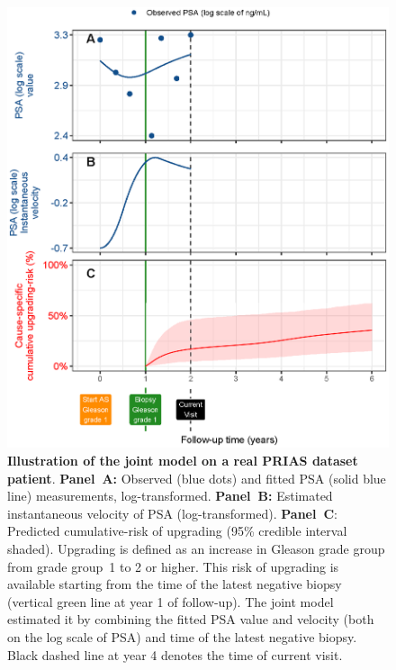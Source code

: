 \begin{figure}
\centerline{\includegraphics[width=\columnwidth]{images/jmExplanationPlot_113.eps}}
\caption{\textbf{Illustration of the joint model on a real PRIAS dataset patient}. \textbf{Panel~A:} Observed (blue dots) and fitted PSA (solid blue line) measurements, log-transformed. \textbf{Panel~B:} Estimated instantaneous velocity of PSA (log-transformed). \textbf{Panel~C}: Predicted cumulative-risk of upgrading (95\% credible interval shaded). Upgrading is defined as an increase in Gleason grade group \citep{epsteinGG2014} from grade group~1 to 2 or higher. This risk of upgrading is available starting from the time of the latest negative biopsy (vertical green line at year 1 of follow-up). The joint model estimated it by combining the fitted PSA value and velocity (both on the log scale of PSA) and time of the latest negative biopsy. Black dashed line at year 4 denotes the time of current visit.}
\label{fig:jmExplanationPlot_113}
\end{figure}

